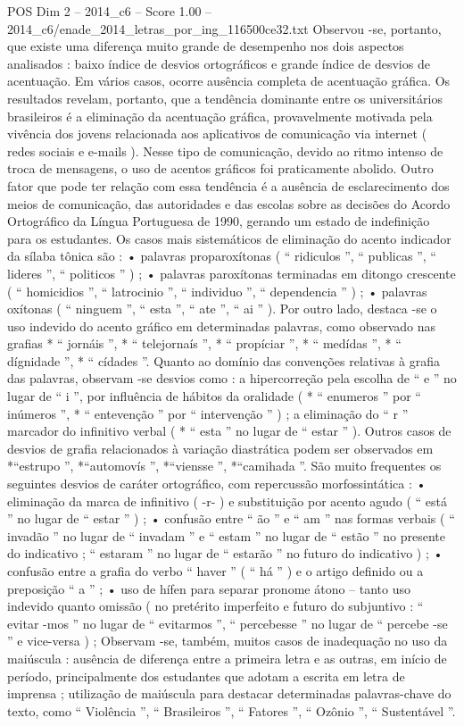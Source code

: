\begin{textsample}{POS Dim 2 – 2014\_c6 – Score 1.00 – 2014\_c6/enade\_2014\_letras\_por\_ing\_116500ce32.txt}
Observou -se, portanto, que existe uma diferença muito grande de desempenho nos dois aspectos analisados : baixo índice de desvios ortográficos e grande índice de desvios de acentuação.
Em vários casos, ocorre ausência completa de acentuação gráfica.
Os resultados revelam, portanto, que a tendência dominante entre os universitários brasileiros é a eliminação da acentuação gráfica, provavelmente motivada pela vivência dos jovens relacionada aos aplicativos de comunicação via internet ( redes sociais e e-mails ).
Nesse tipo de comunicação, devido ao ritmo intenso de troca de mensagens, o uso de acentos gráficos foi praticamente abolido.
Outro fator que pode ter relação com essa tendência é a ausência de esclarecimento dos meios de comunicação, das autoridades e das escolas sobre as decisões do Acordo Ortográfico da Língua Portuguesa de 1990, gerando um estado de indefinição para os estudantes.
Os casos mais sistemáticos de eliminação do acento indicador da sílaba tônica são : • palavras proparoxítonas ( “ ridiculos ”, “ publicas ”, “ lideres ”, “ politicos ” ) ; • palavras paroxítonas terminadas em ditongo crescente ( “ homicidios ”, “ latrocinio ”, “ individuo ”, “ dependencia ” ) ; • palavras oxítonas ( “ ninguem ”, “ esta ”, “ ate ”, “ ai ” ).
Por outro lado, destaca -se o uso indevido do acento gráfico em determinadas palavras, como observado nas grafias * “ jornáis ”, * “ telejornaís ”, * “ propíciar ”, * “ medídas ”, * “ dígnidade ”, * “ cídades ”.
Quanto ao domínio das convenções relativas à grafia das palavras, observam -se desvios como : a hipercorreção pela escolha de “ e ” no lugar de “ i ”, por influência de hábitos da oralidade ( * “ enumeros ” por “ inúmeros ”, * “ entevenção ” por “ intervenção ” ) ; a eliminação do “ r ” marcador do infinitivo verbal ( * “ esta ” no lugar de “ estar ” ).
Outros casos de desvios de grafia relacionados à variação diastrática podem ser observados em *“estrupo ”, *“automovís ”, *“viensse ”, *“camihada ”.
São muito frequentes os seguintes desvios de caráter ortográfico, com repercussão morfossintática : • eliminação da marca de infinitivo ( -r- ) e substituição por acento agudo ( “ está ” no lugar de “ estar ” ) ; • confusão entre “ ão ” e “ am ” nas formas verbais ( “ invadão ” no lugar de “ invadam ” e “ estam ” no lugar de “ estão ” no presente do indicativo ; “ estaram ” no lugar de “ estarão ” no futuro do indicativo ) ; • confusão entre a grafia do verbo “ haver ” ( “ há ” ) e o artigo definido ou a preposição “ a ” ; • uso de hífen para separar pronome átono – tanto uso indevido quanto omissão ( no pretérito imperfeito e futuro do subjuntivo : “ evitar -mos ” no lugar de “ evitarmos ”, “ percebesse ” no lugar de “ percebe -se ” e vice-versa ) ; Observam -se, também, muitos casos de inadequação no uso da maiúscula : ausência de diferença entre a primeira letra e as outras, em início de período, principalmente dos estudantes que adotam a escrita em letra de imprensa ; utilização de maiúscula para destacar determinadas palavras-chave do texto, como “ Violência ”, “ Brasileiros ”, “ Fatores ”, “ Ozônio ”, “ Sustentável ”.

\end{textsample}
